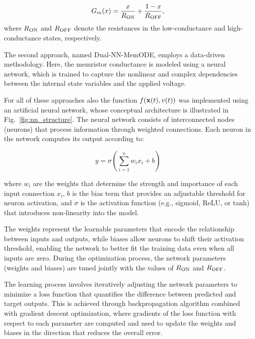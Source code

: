 \documentclass[11pt, oneside]{article}
\newcommand{\Ron}{R_{\rm ON}}
\newcommand{\Roff}{R_{\rm OFF}}
\newcommand{\ua}{v}
\begin{document}
\begin{equation}
    G_{m}(x) = \frac{x}{R_{\rm ON}} + \frac{1 - x}{R_{\rm OFF}},
    \label{eq:conductance}
\end{equation}
where $\Ron$ and $\Roff$ denote the resistances in the low-conductance and high-conductance states, respectively.

The second approach, named Dual-NN-MemODE, employs a data-driven methodology. Here, the memristor conductance is modeled using a neural network, which is trained to capture the nonlinear and complex dependencies between the internal state variables and the applied voltage.

For all of these approaches also the function $f(\xvec(t), \ua(t))$ was implemented using an artificial neural network, whose conceptual architecture is illustrated in Fig.~\ref{fig:nn_structure}. The neural network consists of interconnected nodes (neurons) that process information through weighted connections. Each neuron in the network computes its output according to:

\begin{equation}
    y = \sigma\left(\sum_{i=1}^{n} w_i x_i + b\right)
\end{equation}

where $w_i$ are the weights that determine the strength and importance of each input connection $x_i$, $b$ is the bias term that provides an adjustable threshold for neuron activation, and $\sigma$ is the activation function (e.g., sigmoid, ReLU, or tanh) that introduces non-linearity into the model.

The weights represent the learnable parameters that encode the relationship between inputs and outputs, while biases allow neurons to shift their activation threshold, enabling the network to better fit the training data even when all inputs are zero. During the optimization process, the network parameters (weights and biases) are tuned jointly with the values of $R_{\rm ON}$ and $R_{\rm OFF}$.

The learning process involves iteratively adjusting the network parameters to minimize a loss function that quantifies the difference between predicted and target outputs. This is  achieved through backpropagation algorithm combined with gradient descent optimization, where gradients of the loss function with respect to each parameter are computed and used to update the weights and biases in the direction that reduces the overall error.
\end{document}
